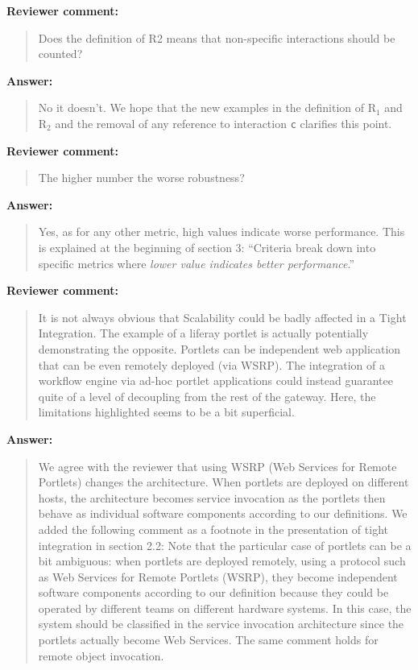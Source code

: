 \documentclass[a4]{article}
\newenvironment{review}%
{\textbf{Reviewer comment:}\begin{quote}}%
{\end{quote}}%
\newenvironment{answer}%
{\textbf{Answer:}\begin{small}\begin{quote}}%
{\end{quote}\end{small}}%
\newcommand{\revised}[1]{\color{blue} #1\color{black}\xspace}
\begin{document}
\begin{review}
Does the definition of R2 means that non-specific
  interactions should be counted?
\end{review}

\begin{answer}
No it doesn't. We hope that the new examples in the definition of
R$_1$ and R$_2$ and the removal of any reference to interaction
\texttt{c} clarifies this point.
\end{answer}

\begin{review}
The higher number the worse
  robustness?
\end{review}

\begin{answer}
  Yes, as for any other metric, high values indicate worse
  performance. This is explained at the beginning of section 3:
  ``Criteria break down into specific metrics where \emph{lower value
    indicates better performance}.''
\end{answer}

\begin{review}
  It is not always obvious that Scalability could be badly affected in
  a Tight Integration. The example of a liferay portlet is actually
  potentially demonstrating the opposite. Portlets can be independent
  web application that can be even remotely deployed (via WSRP). The
  integration of a workflow engine via ad-hoc portlet applications
  could instead guarantee quite of a level of decoupling from the rest
  of the gateway. Here, the limitations highlighted seems to be a bit
  superficial.
\end{review}

\begin{answer}
  We agree with the reviewer that using WSRP (Web Services for Remote
  Portlets) changes the architecture. When portlets are deployed on
  different hosts, the architecture becomes service invocation as the
  portlets then behave as individual software components according to
  our definitions. We added the following comment as a footnote in the
  presentation of tight integration in section 2.2: \revised{Note that
    the particular case of portlets can be a bit ambiguous: when
    portlets are deployed remotely, using a protocol such as Web
    Services for Remote Portlets (WSRP), they become independent
    software components according to our definition because they could
    be operated by different teams on different hardware systems. In
    this case, the system should be classified in the service
    invocation architecture since the portlets actually become Web
    Services. The same comment holds for remote object invocation.}
\end{answer}
\end{document}
